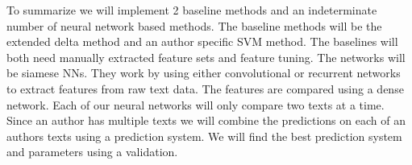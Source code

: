 To summarize we will implement 2 baseline methods and an indeterminate number of
neural network based methods. The baseline methods will be the extended delta
method and an author specific \gls{SVM} method. The baselines will both need
manually extracted feature sets and feature tuning. The networks will be siamese
\glspl{NN}. They work by using either convolutional or recurrent networks to
extract features from raw text data. The features are compared using a dense
network. Each of our neural networks will only compare two texts at a time.
Since an author has multiple texts we will combine the predictions on each of an
authors texts using a prediction system. We will find the best prediction system
and parameters using a validation.

